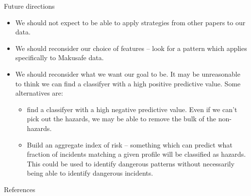 \documentclass{beamer}
\begin{document}
\begin{frame}{Future directions}
\begin{itemize}
\item We should not expect to be able to apply strategies from other papers to our data.
\item We should reconsider our choice of features -- look for a pattern which applies specifically to Makusafe data.
\item We should reconsider what we want our goal to be. It may be unreasonable to think we can find a classifyer with a high positive predictive value. Some alternatives are:
\begin{itemize}
	\item find a classifyer with a high negative predictive value. Even if we can't pick out the hazards, we may be able to remove the bulk of the non-hazards.
	\item Build an aggregate index of risk -- something which can predict what fraction of incidents matching a given profile will be classified as hazards. This could be used to identify dangerous patterns without necessarily being able to identify dangerous incidents.
\end{itemize}
\end{itemize}
\end{frame}

\begin{frame}[allowframebreaks]{References}
\printbibliography
\end{frame}
\end{document}
